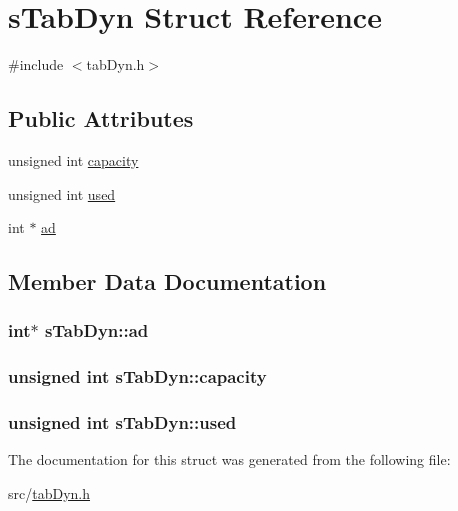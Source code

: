 \hypertarget{structs_tab_dyn}{\section{s\+Tab\+Dyn Struct Reference}
\label{structs_tab_dyn}
}


{\ttfamily \#include $<$tab\+Dyn.\+h$>$}

\subsection*{Public Attributes}
\begin{DoxyCompactItemize}
\item 
unsigned int \hyperlink{structs_tab_dyn_abd87f87c6e50d3fabfceeef6e72e0166}{capacity}
\item 
unsigned int \hyperlink{structs_tab_dyn_a12df70ba0e58233267df4697e7d95fd2}{used}
\item 
int $\ast$ \hyperlink{structs_tab_dyn_a4fe25a642a287e57ed3d7931f255e8dc}{ad}
\end{DoxyCompactItemize}


\subsection{Member Data Documentation}
\hypertarget{structs_tab_dyn_a4fe25a642a287e57ed3d7931f255e8dc}{
\subsubsection[{ad}]{\setlength{\rightskip}{0pt plus 5cm}int$\ast$ s\+Tab\+Dyn\+::ad}}\label{structs_tab_dyn_a4fe25a642a287e57ed3d7931f255e8dc}
\hypertarget{structs_tab_dyn_abd87f87c6e50d3fabfceeef6e72e0166}{
\subsubsection[{capacity}]{\setlength{\rightskip}{0pt plus 5cm}unsigned int s\+Tab\+Dyn\+::capacity}}\label{structs_tab_dyn_abd87f87c6e50d3fabfceeef6e72e0166}
\hypertarget{structs_tab_dyn_a12df70ba0e58233267df4697e7d95fd2}{
\subsubsection[{used}]{\setlength{\rightskip}{0pt plus 5cm}unsigned int s\+Tab\+Dyn\+::used}}\label{structs_tab_dyn_a12df70ba0e58233267df4697e7d95fd2}


The documentation for this struct was generated from the following file\+:\begin{DoxyCompactItemize}
\item 
src/\hyperlink{tab_dyn_8h}{tab\+Dyn.\+h}\end{DoxyCompactItemize}
